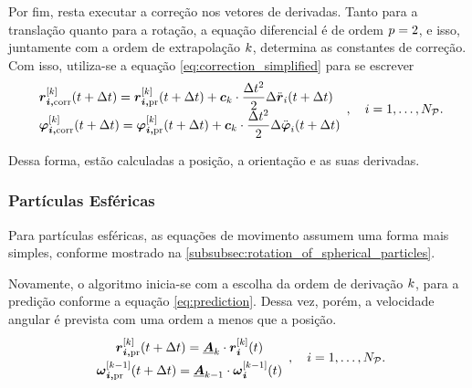 Por fim, resta executar a correção nos vetores de derivadas. Tanto para a translação quanto para a rotação, a equação diferencial é de ordem \(p = 2\), e isso, juntamente com a ordem de extrapolação \(k\), determina as constantes de correção. Com isso, utiliza-se a equação \eqref{eq:correction_simplified} para se escrever	
\begin{equation*}
	\def\arraystretch{1.5}
	\begin{array}{l}
		\drvec{\taylorOrder}{\positionicorr}\pqty{t+\Dt} = \drvec{\taylorOrder}{\positionipr}\pqty{t+\Dt} + \correctorConstantVector{\taylorOrder}\cdot\dfrac{\Dt^2}{2}\Delta \accelerationi\pqty{t+\Dt} \\
		\drvec{\taylorOrder}{\orientationicorr}\pqty{t+\Dt} = \drvec{\taylorOrder}{\orientationipr}\pqty{t+\Dt} + \correctorConstantVector{\taylorOrder}\cdot\dfrac{\Dt^2}{2}\Delta \dorientationi{2}\pqty{t+\Dt}
	\end{array}, \quad i = 1, \dots, \numberOfParticles.
\end{equation*}

Dessa forma, estão calculadas a posição, a orientação e as suas derivadas.

\subsubsection*{Partículas Esféricas}

Para partículas esféricas, as equações de movimento assumem uma forma mais simples, conforme mostrado na \autoref{subsubsec:rotation_of_spherical_particles}. 

Novamente, o algoritmo inicia-se com a escolha da ordem de derivação \(k\), para a predição conforme a equação \eqref{eq:prediction}. Dessa vez, porém, a velocidade angular é prevista com uma ordem a menos que a posição.
\begin{equation*}
	\def\arraystretch{1.5}
	\begin{array}{c}
		\drvec{\taylorOrder}{\positionipr}\pqty{t+\Dt} = \extrapolationMatrix{\taylorOrder}\cdot\drvec{\taylorOrder}{\positioni}\pqty{t} \\
		\drvec{\taylorOrder-1}{\angularVelocityipr}\pqty{t+\Dt} = \extrapolationMatrix{\taylorOrder-1}\cdot\drvec{\taylorOrder-1}{\angularVelocityi}\pqty{t} \\
	\end{array}, \quad i = 1, \dots, \numberOfParticles.
\end{equation*}

